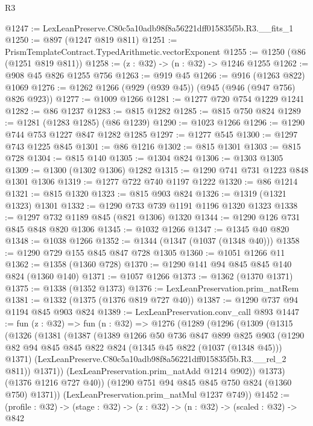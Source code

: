 \begin{lexlean}{R3}
\begin{coremodule}
@1247 := LexLeanPreserve.C80c5a10adb98f8a56221dff015835f5b.R3.__fits_1
@1250 := @897 (@1247 @819 @811)
@1251 := PrismTemplateContract.TypedArithmetic.vectorExponent
@1255 := @1250 (@86 (@1251 @819 @811))
@1258 := (z : @32) -> (n : @32) -> @1246 @1255
@1262 := @908 @45 @826 @1255 @756
@1263 := @919 @45
@1266 := @916 (@1263 @822) @1069
@1276 := @1262 @1266 (@929 (@939 @45)) (@945 (@946 (@947 @756) @826 @923))
@1277 := @1009 @1266
@1281 := @1277 @720 @754 @1229 @1241
@1282 := @86 @1237
@1283 := @815 @1282
@1285 := @815 @750 @824
@1289 := @1281 (@1283 @1285) (@86 @1239)
@1290 := @1023 @1266
@1296 := @1290 @744 @753 @1227 @847 @1282 @1285
@1297 := @1277 @545
@1300 := @1297 @743 @1225 @845
@1301 := @86 @1216
@1302 := @815 @1301
@1303 := @815 @728
@1304 := @815 @140
@1305 := @1304 @824
@1306 := @1303 @1305
@1309 := @1300 (@1302 @1306) @1282
@1315 := @1290 @741 @731 @1223 @848 @1301 @1306
@1319 := @1277 @722 @740 @1197 @1222
@1320 := @86 @1214
@1321 := @815 @1320
@1323 := @815 @903 @824
@1326 := @1319 (@1321 @1323) @1301
@1332 := @1290 @733 @739 @1191 @1196 @1320 @1323
@1338 := @1297 @732 @1189 @845 (@821 @1306) @1320
@1344 := @1290 @126 @731 @845 @848 @820 @1306
@1345 := @1032 @1266
@1347 := @1345 @40 @820
@1348 := @1038 @1266
@1352 := @1344 (@1347 (@1037 (@1348 @40)))
@1358 := @1290 @729 @155 @845 @847 @728 @1305
@1360 := @1051 @1266 @11
@1362 := @1358 (@1360 @728)
@1370 := @1290 @141 @94 @845 @845 @140 @824 (@1360 @140)
@1371 := @1057 @1266
@1373 := @1362 (@1370 @1371)
@1375 := @1338 (@1352 @1373)
@1376 := LexLeanPreservation.prim_natRem
@1381 := @1332 (@1375 (@1376 @819 @727 @40))
@1387 := @1290 @737 @94 @1194 @845 @903 @824
@1389 := LexLeanPreservation.conv_call @893
@1447 := fun (z : @32) =>
  fun (n : @32) =>
  @1276
    (@1289
      (@1296
        (@1309
          (@1315
            (@1326
              (@1381
                (@1387
                  (@1389
                    @1266
                    @50
                    @736
                    @847
                    @899
                    @825
                    @903
                    (@1290 @82 @94 @845 @845 @822 @824 (@1345 @45 @822 (@1037 (@1348 @45))) @1371)
                    (LexLeanPreserve.C80c5a10adb98f8a56221dff015835f5b.R3.__rel_2 @811))
                  @1371))
              (LexLeanPreservation.prim_natAdd @1214 @902))
            @1373)
          (@1376 @1216 @727 @40))
        (@1290 @751 @94 @845 @845 @750 @824 (@1360 @750) @1371))
      (LexLeanPreservation.prim_natMul @1237 @749))
@1452 := (profile : @32) -> (stage : @32) -> (z : @32) -> (n : @32) -> (scaled : @32) -> @842

\end{coremodule}
\end{lexlean}
